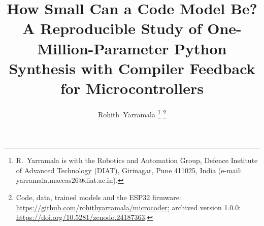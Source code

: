\IfFileExists{IEEEtran.cls}{\documentclass[journal]{IEEEtran}\newcommand{\ieee}{1}}{\documentclass[twocolumn,10pt]{article}\usepackage[margin=0.7in]{geometry}}
\begin{document}
\title{How Small Can a Code Model Be? A Reproducible Study of One-Million-Parameter Python Synthesis with Compiler Feedback for Microcontrollers}
\author{Rohith~Yarramala%
\thanks{R.~Yarramala is with the Robotics and Automation Group, Defence Institute of Advanced Technology (DIAT), Girinagar, Pune 411025, India (e-mail: yarramala.maecas26@diat.ac.in).}
\thanks{Code, data, trained models and the ESP32 firmware: \protect\url{https://github.com/rohithyarramala/microcoder}; archived version 1.0.0: \protect\url{https://doi.org/10.5281/zenodo.24187363}.}}
\maketitle

\begin{abstract}

\end{abstract}

\begin{IEEEkeywords}

\end{IEEEkeywords}




\end{document}
